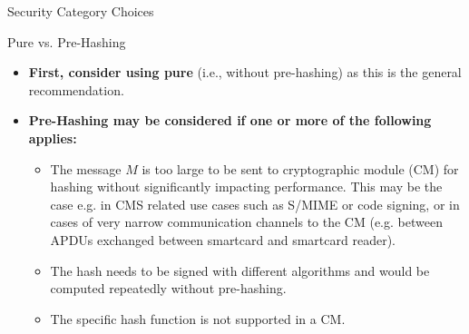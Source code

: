 \begin{minipage}[t]{0.28\textwidth}
\begin{algorithmbox}{Security Category Choices}
\begin{itemize}[leftmargin=*]
        \end{itemize}
    \end{algorithmbox}
    \begin{algorithmbox}{Pure vs. Pre-Hashing}
        \scriptsize
        \begin{itemize}[leftmargin=*]
            \setlength\itemsep{0em}
            \item {\bfseries First, consider using  pure} (i.e., without pre-hashing) as this is the general recommendation.\\
            \item {\bfseries Pre-Hashing may be considered if one or more of the following applies:}
            \begin{itemize}[leftmargin=*]
                \setlength\itemsep{0em}
                \item The message $M$ is too large to be sent to cryptographic module (CM) for hashing without significantly impacting performance. This may be the case e.g. in CMS related use cases such as S/MIME or code signing, or in cases of very narrow communication channels to the CM (e.g. between APDUs exchanged between smartcard and smartcard reader).
                \item The hash needs to be signed with different algorithms and would be computed repeatedly without pre-hashing.
                \item The specific hash function is not supported in a CM.
            \end{itemize}
        \end{itemize}
        \vspace{0.75mm}
    \end{algorithmbox}
\end{minipage}

